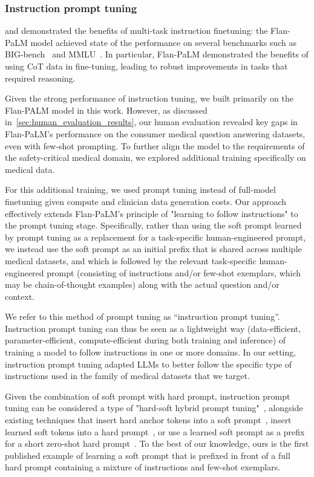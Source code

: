 \subsubsection{Instruction prompt tuning} 
\label{sec:instruction_prompt_tuning}
\citet{wei2021finetuned} and \citet{chung2022scaling} demonstrated the benefits of multi-task instruction finetuning: the Flan-PaLM model achieved state of the performance on several benchmarks such as BIG-bench~\cite{lewkowycz2022solving} and MMLU~\cite{hendrycks2020measuring}. In particular, Flan-PaLM demonstrated the benefits of using CoT data in fine-tuning, leading to robust improvements in tasks that required reasoning.

Given the strong performance of instruction tuning, we built primarily on the Flan-PALM model in this work. However, as discussed in~\ref{sec:human_evaluation_results}, our human evaluation revealed key gaps in Flan-PaLM's performance on the consumer medical question answering datasets, even with few-shot prompting. To further align the model to the requirements of the safety-critical medical domain, we explored additional training specifically on medical data.

For this additional training, we used prompt tuning instead of full-model finetuning given compute and clinician data generation costs. Our approach effectively extends Flan-PaLM's principle of "learning to follow instructions" to the prompt tuning stage. Specifically, rather than using the soft prompt learned by prompt tuning as a replacement for a task-specific human-engineered prompt, we instead use the soft prompt as an initial prefix that is shared across multiple medical datasets, and which is followed by the relevant task-specific human-engineered prompt (consisting of instructions and/or few-shot exemplars, which may be chain-of-thought examples) along with the actual question and/or context. 

We refer to this method of prompt tuning as ``instruction prompt tuning''. Instruction prompt tuning can thus be seen as a lightweight way (data-efficient, parameter-efficient, compute-efficient during both training and inference) of training a model to follow instructions in one or more domains. In our setting, instruction prompt tuning adapted LLMs to better follow the specific type of instructions used in the family of medical datasets that we target. 

Given the combination of soft prompt with hard prompt, instruction prompt tuning can be considered a type of "hard-soft hybrid prompt tuning"~\cite{liu2021pre}, alongside existing techniques that insert hard anchor tokens into a soft prompt~\cite{liu2021gpt}, insert learned soft tokens into a hard prompt~\cite{han2022ptr}, or use a learned soft prompt as a prefix for a short zero-shot hard prompt~\cite{gu2021ppt, ye2022retrieval}. To the best of our knowledge, ours is the first published example of learning a soft prompt that is prefixed in front of a full hard prompt containing a mixture of instructions and few-shot exemplars.

